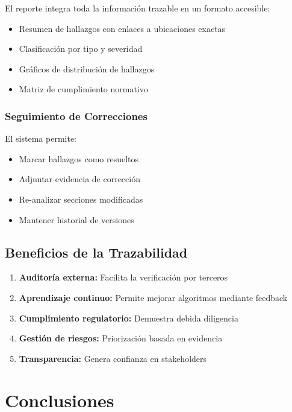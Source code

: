 \documentclass[12pt,a4paper]{article}
\begin{document}
El reporte integra toda la información trazable en un formato accesible:

\begin{itemize}[leftmargin=*]
    \item Resumen de hallazgos con enlaces a ubicaciones exactas
    \item Clasificación por tipo y severidad
    \item Gráficos de distribución de hallazgos
    \item Matriz de cumplimiento normativo
\end{itemize}

\subsubsection{Seguimiento de Correcciones}

El sistema permite:

\begin{itemize}[leftmargin=*]
    \item Marcar hallazgos como resueltos
    \item Adjuntar evidencia de corrección
    \item Re-analizar secciones modificadas
    \item Mantener historial de versiones
\end{itemize}

\subsection{Beneficios de la Trazabilidad}

\begin{enumerate}[leftmargin=*]
    \item \textbf{Auditoría externa:} Facilita la verificación por terceros
    \item \textbf{Aprendizaje continuo:} Permite mejorar algoritmos mediante feedback
    \item \textbf{Cumplimiento regulatorio:} Demuestra debida diligencia
    \item \textbf{Gestión de riesgos:} Priorización basada en evidencia
    \item \textbf{Transparencia:} Genera confianza en stakeholders
\end{enumerate}

\section{Conclusiones}
\end{document}
